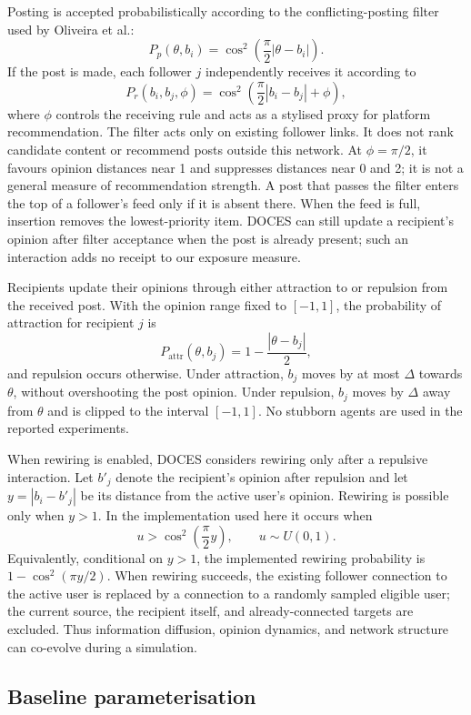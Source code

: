 \documentclass[runningheads]{llncs}
\begin{document}
Posting is accepted probabilistically according to the conflicting-posting filter used by Oliveira et al.:
\[
P_p(\theta,b_i)=
\cos^2\left(\frac{\pi}{2}|\theta-b_i|\right).
\]
If the post is made, each follower \(j\) independently receives it according to
\[
P_r(b_i,b_j,\phi)=
\cos^2\left(\frac{\pi}{2}|b_i-b_j|+\phi\right),
\]
where \(\phi\) controls the receiving rule and acts as a stylised proxy for platform recommendation. The filter acts only on existing follower links. It does not rank candidate content or recommend posts outside this network. At \(\phi=\pi/2\), it favours opinion distances near 1 and suppresses distances near 0 and 2; it is not a general measure of recommendation strength. A post that passes the filter enters the top of a follower's feed only if it is absent there. When the feed is full, insertion removes the lowest-priority item. DOCES can still update a recipient's opinion after filter acceptance when the post is already present; such an interaction adds no receipt to our exposure measure.

Recipients update their opinions through either attraction to or repulsion from the received post. With the opinion range fixed to \([-1,1]\), the probability of attraction for recipient \(j\) is
\[
P_{\mathrm{attr}}(\theta,b_j)
    = 1-\frac{|\theta-b_j|}{2},
\]
and repulsion occurs otherwise. Under attraction, \(b_j\) moves by at most \(\Delta\) towards \(\theta\), without overshooting the post opinion. Under repulsion, \(b_j\) moves by \(\Delta\) away from \(\theta\) and is clipped to the interval \([-1,1]\). No stubborn agents are used in the reported experiments.

When rewiring is enabled, DOCES considers rewiring only after a repulsive interaction. Let \(b'_j\) denote the recipient's opinion after repulsion and let \(y=|b_i-b'_j|\) be its distance from the active user's opinion. Rewiring is possible only when \(y>1\). In the implementation used here it occurs when
\[
u > \cos^2\left(\frac{\pi}{2}y\right),
\qquad u\sim U(0,1).
\]
Equivalently, conditional on \(y>1\), the implemented rewiring probability is \(1-\cos^2(\pi y/2)\). When rewiring succeeds, the existing follower connection to the active user is replaced by a connection to a randomly sampled eligible user; the current source, the recipient itself, and already-connected targets are excluded. Thus information diffusion, opinion dynamics, and network structure can co-evolve during a simulation.

\subsection{Baseline parameterisation}
\end{document}
